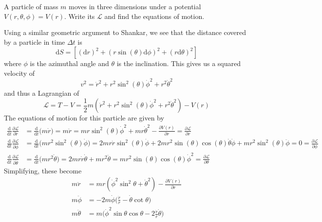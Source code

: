 \documentclass[../principles-of-quantum-mechanics.tex]{subfiles}
\begin{document}
\begin{questions}
		\question A particle of mass $m$ moves in three dimensions under a potential $V(r, \theta, \phi) = V(r)$. Write its $\mathcal{L}$ and find the equations of motion.
		
		\begin{solution}
			Using a similar geometric argument to Shankar, we see that the distance covered by a particle in time $\Delta{t}$ is
			\[
				\mathrm{d}S = [(\mathrm{d}r)^2 + (r\sin(\theta)\mathrm{d}\phi)^2 + (r\mathrm{d}\theta)^2]
			\]
			where $\phi$ is the azimuthal angle and $\theta$ is the inclination. This gives us a squared velocity of
			\[
				v^2 = \dot{r}^2 + r^2\sin^2(\theta)\dot{\phi}^2 + r^2\dot{\theta}^2
			\]
			and thus a Lagrangian of
			\[
				\mathcal{L} = T - V = \frac{1}{2}m(\dot{r}^2 + r^2\sin^2(\theta)\dot{\phi}^2 + r^2\dot{\theta}^2) - V(r)
			\]
			The equations of motion for this particle are given by
			\begin{align*}
			\frac{\mathrm{d}}{\mathrm{d}t}\frac{\partial\mathcal{L}}{\partial\dot{r}} &= \frac{\mathrm{d}}{\mathrm{d}t}\Big(m\dot{r}\Big) = m\ddot{r} = mr\sin^2(\theta)\dot{\phi}^2 + mr\dot{\theta}^2 - \frac{\partial{V(r)}}{\partial{r}} = \frac{\partial\mathcal{L}}{\partial{r}} \\
			\frac{\mathrm{d}}{\mathrm{d}t}\frac{\partial\mathcal{L}}{\partial\dot{\phi}} &= \frac{\mathrm{d}}{\mathrm{d}t}\Big(mr^2\sin^2(\theta)\dot{\phi}\Big) = 2mr\dot{r}\sin^2(\theta)\dot{\phi} + 2mr^2\sin(\theta)\cos(\theta)\dot{\theta}\dot{\phi} + mr^2\sin^2(\theta)\ddot{\phi} = 0 = \frac{\partial\mathcal{L}}{\partial{\phi}} \\
			\frac{\mathrm{d}}{\mathrm{d}t}\frac{\partial\mathcal{L}}{\partial\dot{\theta}} &= \frac{\mathrm{d}}{\mathrm{d}t}\Big(mr^2\dot{\theta}\Big) = 2mr\dot{r}\dot{\theta} + mr^2\ddot{\theta} = mr^2\sin(\theta)\cos(\theta)\dot{\phi}^2 =  \frac{\partial\mathcal{L}}{\partial{\theta}}
			\end{align*}
			Simplifying, these become
			\begin{align*}
				m\ddot{r} &= mr(\dot{\phi}^2\sin^2\theta + \dot{\theta}^2) - \frac{\partial{V}(r)}{\partial{r}} \\
				m\ddot{\phi} &= -2m\dot{\phi}\Big(\frac{\dot{r}}{r} - \dot{\theta}\cot\theta\Big) \\
				m\ddot{\theta} &= m\Big(\dot{\phi}^2\sin\theta\cos\theta  - 2\frac{\dot{r}}{r}\dot{\theta}\Big)
			\end{align*}
		\end{solution}
	
		\setcounter{subsection}{2}
		\setcounter{question}{0}

\end{questions}
\end{document}
